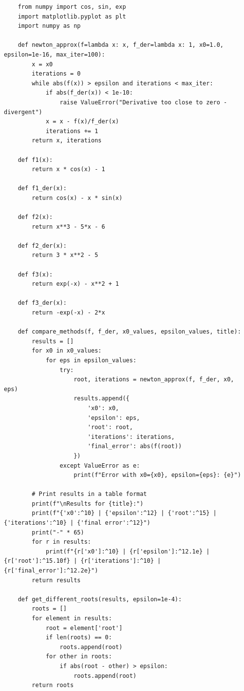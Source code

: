 \documentclass[a4paper,12pt]{article}
\begin{document}
    \begin{lstlisting}
    from numpy import cos, sin, exp
    import matplotlib.pyplot as plt
    import numpy as np
    
    def newton_approx(f=lambda x: x, f_der=lambda x: 1, x0=1.0, epsilon=1e-16, max_iter=100):
        x = x0
        iterations = 0
        while abs(f(x)) > epsilon and iterations < max_iter:
            if abs(f_der(x)) < 1e-10:
                raise ValueError("Derivative too close to zero - divergent")
            x = x - f(x)/f_der(x)
            iterations += 1
        return x, iterations
    
    def f1(x):
        return x * cos(x) - 1
    
    def f1_der(x):
        return cos(x) - x * sin(x)
    
    def f2(x):
        return x**3 - 5*x - 6
    
    def f2_der(x):
        return 3 * x**2 - 5
    
    def f3(x):
        return exp(-x) - x**2 + 1
    
    def f3_der(x):
        return -exp(-x) - 2*x
    
    def compare_methods(f, f_der, x0_values, epsilon_values, title):
        results = []
        for x0 in x0_values:
            for eps in epsilon_values:
                try:
                    root, iterations = newton_approx(f, f_der, x0, eps)
                    results.append({
                        'x0': x0,
                        'epsilon': eps,
                        'root': root,
                        'iterations': iterations,
                        'final_error': abs(f(root))
                    })
                except ValueError as e:
                    print(f"Error with x0={x0}, epsilon={eps}: {e}")
    
        # Print results in a table format
        print(f"\nResults for {title}:")
        print(f"{'x0':^10} | {'epsilon':^12} | {'root':^15} | {'iterations':^10} | {'final error':^12}")
        print("-" * 65)
        for r in results:
            print(f"{r['x0']:^10} | {r['epsilon']:^12.1e} | {r['root']:^15.10f} | {r['iterations']:^10} | {r['final_error']:^12.2e}")
        return results
    
    def get_different_roots(results, epsilon=1e-4):
        roots = [] 
        for element in results:
            root = element['root']
            if len(roots) == 0:
                roots.append(root)
            for other in roots:
                if abs(root - other) > epsilon:
                    roots.append(root)
        return roots
    \end{lstlisting}
    
\end{document}
